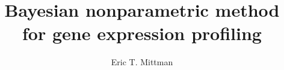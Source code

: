 \documentclass[12pt]{article}
\title{Bayesian nonparametric method for gene expression profiling}
\author{Eric T. Mittman}
\begin{document}
  \maketitle

  \tableofcontents

  \doublespacing

  

  
\end{document}
